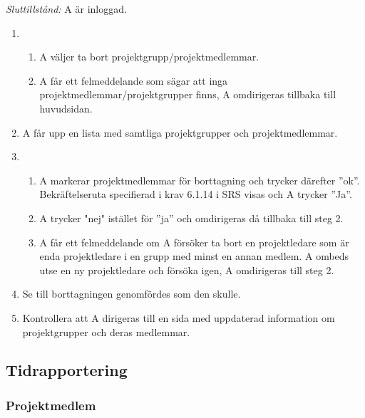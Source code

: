 \documentclass[a4paper]{article}
\begin{document}
\begin{ST}
\emph{Sluttillstånd:} A är inloggad.

\begin{enumerate}
\item 
\begin{enumerate}
\item A väljer ta bort projektgrupp/projektmedlemmar.
\item A får ett felmeddelande som sägar att inga projektmedlemmar/projektgrupper finns, A omdirigeras tillbaka till huvudsidan.
\end{enumerate}
\item A får upp en lista med samtliga projektgrupper och projektmedlemmar.
\item 
\begin{enumerate}
\item A markerar projektmedlemmar för borttagning och trycker därefter ''ok''. Bekräftelseruta specifierad i krav 6.1.14 i SRS visas och A trycker ''Ja''.
\item A trycker "nej" istället för ''ja'' och omdirigeras då tillbaka till steg 2.
\item A får ett felmeddelande om A försöker ta bort en projektledare som är enda projektledare i en grupp med minst en annan medlem. A ombeds utse en ny projektledare och försöka igen, A omdirigeras till steg 2.
\end{enumerate}
\item Se till borttagningen genomfördes som den skulle.
\item Kontrollera att A dirigeras till en sida med uppdaterad information om projektgrupper och deras medlemmar.
\end{enumerate}

\end{ST}




\subsection{Tidrapportering}
\subsubsection{Projektmedlem}
\end{document}
